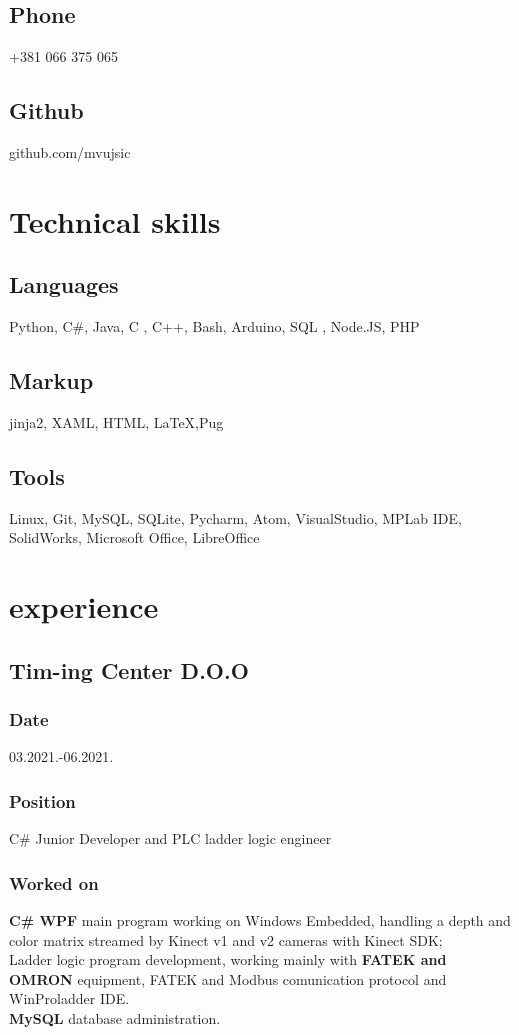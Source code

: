 \documentclass[10pt]{article}
\begin{document}
\subsection{Phone}
+381 066 375 065
\subsection{Github}
github.com/mvujsic

\section{Technical skills}
\subsection{Languages}
Python, C\#, Java, C , C++, Bash, Arduino, SQL , Node.JS, PHP
\subsection{Markup}
 jinja2, XAML, HTML, \LaTeX,Pug
\subsection{Tools}
Linux, Git, MySQL, SQLite, Pycharm, Atom, VisualStudio, MPLab IDE, SolidWorks,  Microsoft Office,  LibreOffice

\section{experience}
\subsection{\large{Tim-ing Center D.O.O}}
\subsubsection{Date}
03.2021.-06.2021.
\subsubsection{Position}
C\# Junior Developer and PLC ladder logic engineer
\subsubsection{Worked on}
\textbf{C\# WPF} main program working on Windows Embedded, handling a depth and color matrix streamed by Kinect v1 and v2 cameras with Kinect SDK;\\
Ladder logic program development, working mainly with \textbf{FATEK and OMRON} equipment, FATEK and Modbus comunication protocol and WinProladder IDE.\\
\textbf{MySQL} database administration.\\
\end{document}
